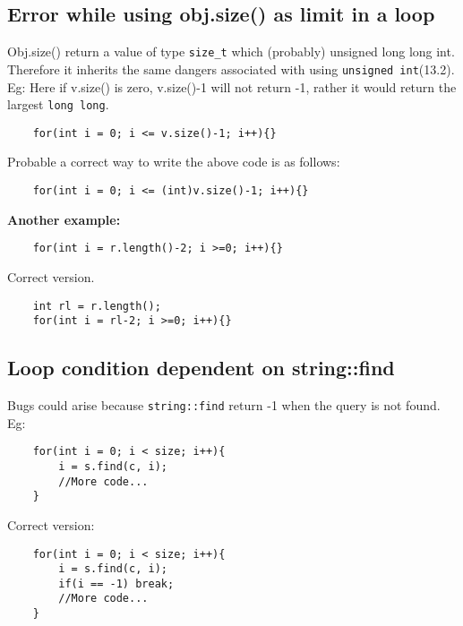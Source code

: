 \subsection{Error while using obj.size() as limit in a loop}
Obj.size() return a value of type \texttt{size\_t} which (probably) unsigned long long int. Therefore it inherits the same dangers associated with using \texttt{unsigned int}(13.2).
Eg: Here if v.size() is zero, v.size()-1 will not return -1, rather it would return the largest \texttt{long long}.
\begin{verbatim}
    for(int i = 0; i <= v.size()-1; i++){}
\end{verbatim}
\vspace{-6pt}
Probable a correct way to write the above code is as follows:
\vspace{-6pt}
\begin{verbatim}
    for(int i = 0; i <= (int)v.size()-1; i++){}
\end{verbatim}
\vspace{-6pt}
\textbf{Another example:}
\vspace{-6pt}
\begin{verbatim}
    for(int i = r.length()-2; i >=0; i++){}	
\end{verbatim}
\vspace{-6pt}
Correct version.
\vspace{-6pt}
\begin{verbatim}
    int rl = r.length();
    for(int i = rl-2; i >=0; i++){}	
\end{verbatim}

\subsection{Loop condition dependent on string::find}
Bugs could arise because \texttt{string::find} return -1 when the query is not found.\\
Eg: 
\vspace{-6pt}
\begin{verbatim}
    for(int i = 0; i < size; i++){
        i = s.find(c, i);
        //More code...
    }
\end{verbatim}


\vspace{-6pt}
Correct version:\\

\vspace{-6pt}
\begin{verbatim}
    for(int i = 0; i < size; i++){
        i = s.find(c, i);
        if(i == -1) break;
        //More code...
    }
\end{verbatim}

